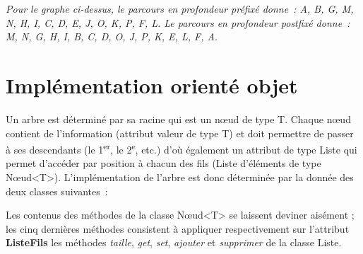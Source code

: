 			{\itshape
			Pour le graphe ci-dessus, le parcours en profondeur préfixé donne~: 
			A, B, G, M, N, H, I, C, D, E, J, O, K, P, F, L. 
			Le parcours en profondeur postfixé donne~: 
			M, N, G, H, I, B, C, D, O, J, P, K, E, L, F, A.}
			

\section{Implémentation orienté objet}

	Un arbre est déterminé par sa racine qui est un n{\oe}ud de type T. 
	Chaque n{\oe}ud contient de l'information (attribut
	valeur de type T) et doit permettre de passer à ses 
	descendants (le 1\textsuperscript{er}, le 2\textsuperscript{e},
	etc.) d'où également un attribut de type Liste qui permet 
	d'accéder par position à chacun des fils (Liste d'éléments de
	type N{\oe}ud<T>). L'implémentation de l'arbre est donc 
	déterminée par la donnée des deux classes suivantes~: 
	
	

	Les contenus des méthodes de la classe N{\oe}ud<T> se laissent 
	deviner aisément ; les cinq dernières méthodes consistent à appliquer 
	respectivement sur l'attribut \textbf{ListeFils} 
	les méthodes \textit{taille}, \textit{get}, \textit{set}, 
	\textit{ajouter} et \textit{supprimer} de la classe Liste.


